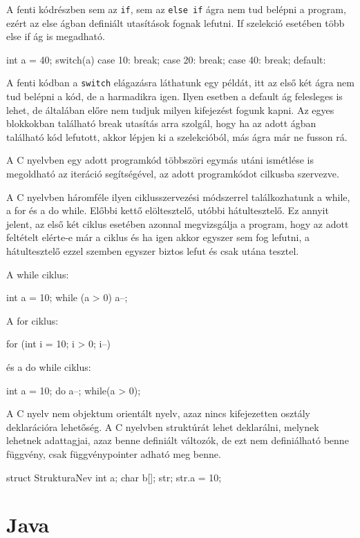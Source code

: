 A fenti kódrészben sem az \texttt{if}, sem az \texttt{else if} ágra nem tud belépni a program, ezért az else ágban definiált utasítások fognak lefutni. If szelekció esetében több else if ág is megadható.
\begin{cpp}
int a = 40;
switch(a) {
	case 10:
		break;
	case 20:
		break;
	case 40:
		break;
	default:
}
\end{cpp}

A fenti kódban a \texttt{switch} elágazásra láthatunk egy példát, itt az első két ágra nem tud belépni a kód, de a harmadikra igen. Ilyen esetben a default ág felesleges is lehet, de általában előre nem tudjuk milyen kifejezést fogunk kapni. Az egyes blokkokban található break utasítás arra szolgál, hogy ha az adott ágban található kód lefutott, akkor lépjen ki a szelekcióból, más ágra már ne fusson rá.

A C nyelvben egy adott programkód többszöri egymás utáni ismétlése is megoldható az iteráció segítségével, az adott programkódot cilkusba szervezve.

A C nyelvben háromféle ilyen ciklusszervezési módszerrel találkozhatunk a while, a for és a do while. Előbbi kettő elöltesztelő, utóbbi hátultesztelő. Ez annyit jelent, az első két ciklus esetében azonnal megvizsgálja a program, hogy az adott feltételt elérte-e már a ciklus és ha igen akkor egyszer sem fog lefutni, a hátultesztelő ezzel szemben egyszer biztos lefut és csak utána tesztel.

A while ciklus:
\begin{cpp}
int a = 10;
while (a > 0) {
	a--;
}
\end{cpp}

A for ciklus:
\begin{cpp}
for (int i = 10; i > 0; i--) {
}
\end{cpp}

és a do while ciklus:
\begin{cpp}
int a = 10;
do {
	a--;
} while(a > 0);
\end{cpp}

A C nyelv nem objektum orientált nyelv, azaz nincs kifejezetten osztály deklarációra lehetőség. A C nyelvben struktúrát lehet deklarálni, melynek lehetnek adattagjai, azaz benne definiált változók, de ezt nem definiálható benne függvény, csak függvénypointer adható meg benne.
\begin{cpp}
struct StrukturaNev {
	int a;
	char b[];
} str;
str.a = 10;
\end{cpp}

\section{Java}

